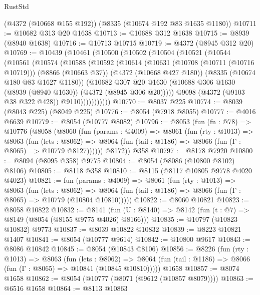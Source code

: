 \begin{lexlean}{RustStd}
\begin{coremodule}
    (@4372 (@10668 @155 @192))
    (@8335 (@10674 @192 @83 @1635 @1180))
@10711 := @10682 @313 @20 @1638
@10713 := @10688 @312 @1638
@10715 := @8939 (@8940 @1638)
@10716 := @10713 @10715
@10719 := @4372 (@8945 @312 @20)
@10769 := @10439
    (@10461
      (@10500
        (@10502
          (@10504
            (@10521
              (@10544
                (@10561
                  (@10574
                    (@10588
                      (@10592
                        (@10614
                          (@10631
                            (@10708 (@10711 (@10716 @10719)))
                            (@8866 (@10663 @37))
                            (@4372 (@10668 @427 @180))
                            (@8335 (@10674 @180 @83 @1627 @1180))
                            (@10682
                              @307
                              @20
                              @1630
                              (@10688 @306 @1630 (@8939 (@8940 @1630)) (@4372 (@8945 @306 @20)))))
                          @9098
                          (@4372 (@9103 @38 @322 @428))
                          @9110)))))))))))
@10770 := @8037 @225
@10774 := @8039 (@8043 @225) (@8049 @225)
@10776 := @8054 (@7918 @8055)
@10777 := @4016 @6639
@10779 := @8054 (@10777 @8082)
@10796 := @8053
    (fun (fn : @78) =>
    @10776
      (@8058
        (@8060
          (fun (params : @4009) =>
          @8061
            (fun (rty : @1013) =>
            @8063
              (fun (lets : @8062) =>
              @8064 (fun (tail : @1186) => @8066 (fun (Γ : @8065) => @10779 @8127))))))
        @8172))
    @358
@10797 := @8178 @7920
@10800 := @8094 (@8095 @358) @9775
@10804 := @8054 (@8086 (@10800 @8102) @8106)
@10805 := @8118 @358
@10810 := @8115 (@8117 @10805 @9778 @4020 @4023)
@10821 := fun (params : @4009) =>
  @8061
    (fun (rty : @1013) =>
    @8063
      (fun (lets : @8062) =>
      @8064 (fun (tail : @1186) => @8066 (fun (Γ : @8065) => @10779 (@10804 @10810)))))
@10822 := @8060 @10821
@10823 := @8058 @10822
@10832 := @8141 (fun (U : @8140) => @8142 (fun (t : @7) => @8149 (@8054 (@8155 @9775 @4026) @8166)))
@10835 := @10797 (@10823 @10832) @9773
@10837 := @8039 @10822 @10832
@10839 := @8223 @10821 @1407
@10841 := @8054 (@10777 @9614)
@10842 := @10800 @9617
@10843 := @8086 @10842
@10845 := @8054 (@10843 @8106)
@10856 := @8226
    (fun (rty : @1013) =>
    @8063
      (fun (lets : @8062) =>
      @8064 (fun (tail : @1186) => @8066 (fun (Γ : @8065) => @10841 (@10845 @10810)))))
    @1658
@10857 := @8074 @1658
@10862 := @8054 (@10777 (@8071 (@9612 (@10857 @8079))))
@10863 := @6516 @1658
@10864 := @8113 @10863

\end{coremodule}
\end{lexlean}
